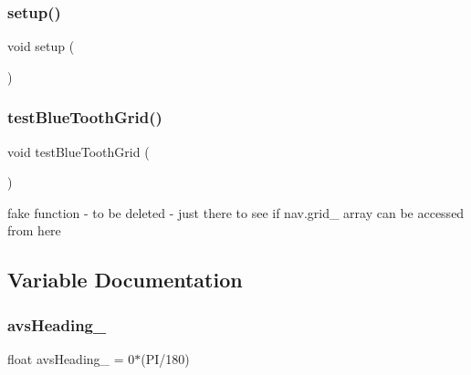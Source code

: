 \mbox{\label{bot_main_8ino_a4fc01d736fe50cf5b977f755b675f11d}} 
\subsubsection{\texorpdfstring{setup()}{setup()}}
{\footnotesize\ttfamily void setup (\begin{DoxyParamCaption}{ }\end{DoxyParamCaption})}

\mbox{\label{bot_main_8ino_a8e570cfb3e7e7e8306ab7c755345c5b8}} 
\subsubsection{\texorpdfstring{test\+Blue\+Tooth\+Grid()}{testBlueToothGrid()}}
{\footnotesize\ttfamily void test\+Blue\+Tooth\+Grid (\begin{DoxyParamCaption}{ }\end{DoxyParamCaption})}



fake function -\/ to be deleted -\/ just there to see if nav.\+grid\+\_\+ array can be accessed from here 



\subsection{Variable Documentation}
\mbox{\label{bot_main_8ino_a26ae4f60d3d4ebfa68763710b6f20e7c}} 
\subsubsection{\texorpdfstring{avs\+Heading\+\_\+}{avsHeading\_}}
{\footnotesize\ttfamily float avs\+Heading\+\_\+ = 0$\ast$(PI/180)}

